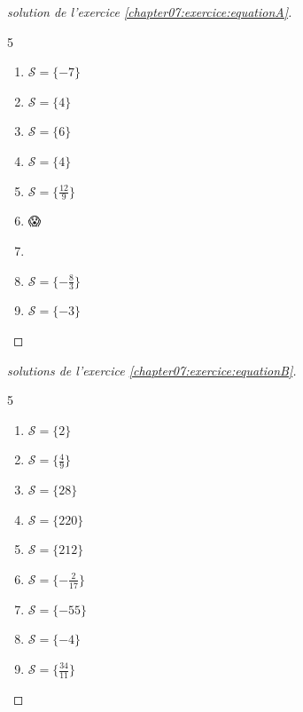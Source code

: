 \newpage
\begin{proof}[solution de l'exercice \ref{chapter07:exercice:equationA}]\hfill 
	\begin{multicols}{5}
		\begin{enumerate}[label={$(E_{\arabic*}$)}, leftmargin=*]
			\item $\mathcal{S}=\{-7\}$
			\item $\mathcal{S}=\{4\}$ 
			\item $\mathcal{S}=\{6\}$ 
			\item   $\mathcal{S}=\{4\}$ 
			\item $\mathcal{S}=\{\tfrac{12}{9}\}$  
			\item { 😱}
			\item { 🤔}
			\item $\mathcal{S}=\{-\tfrac{8}{3}\}$ 
			\item $\mathcal{S}=\{-3\}$ 
		\end{enumerate}
	\end{multicols} 	
\end{proof} 
\begin{proof}[solutions de l'exercice \ref{chapter07:exercice:equationB}]\hfill 
	\begin{multicols}{5}
		\begin{enumerate}[label={$(E_{\arabic*}$)}, leftmargin=*]
			\item  $\mathcal{S}=\{2\}$ 
			\item $\mathcal{S}=\{\tfrac{4}{9}\}$
			\item $\mathcal{S}=\{28\}$ 
			\item $\mathcal{S}=\{220\}$ 
			\item $\mathcal{S}=\{ 212\}$ 
			\item $\mathcal{S}=\{-\tfrac{2}{17}\}$  
			\item $\mathcal{S}=\{-55\}$ 
			\item $\mathcal{S}=\{-4\}$  
			\item $\mathcal{S}=\{\tfrac{34}{11}\}$
		\end{enumerate}
	\end{multicols} 	
\end{proof}

